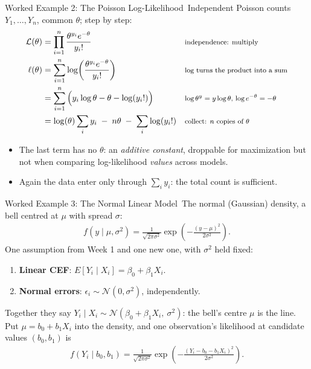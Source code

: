 \documentclass[aspectratio=169,11pt,xcolor=dvipsnames]{beamer}
\newcommand{\E}{E}
\newcommand{\lik}{\mathcal{L}}
\newcommand{\loglik}{\ell}
\newcommand{\core}{\,\raisebox{0.6pt}{\textcolor{corestar}{$\bigstar$}}}
\begin{document}
\begin{frame}{Worked Example 2: The Poisson Log-Likelihood\core}
Independent Poisson counts $Y_1,\dots,Y_n$, common $\theta$; step by step:
\begingroup
\setlength{\abovedisplayskip}{2pt}\setlength{\belowdisplayskip}{2pt}
\begin{align*}
  \lik(\theta) &= \prod_{i=1}^n \frac{\theta^{y_i}e^{-\theta}}{y_i!}
    && \text{\footnotesize independence: multiply} \\
  \loglik(\theta) &= \sum_{i=1}^n \log\!\left(\frac{\theta^{y_i}e^{-\theta}}{y_i!}\right)
    && \text{\footnotesize log turns the product into a sum} \\
  &= \sum_{i=1}^n \Big( y_i\log\theta - \theta - \log(y_i!)\Big)
    && \text{\footnotesize $\log\theta^{y} = y\log\theta$, $\log e^{-\theta} = -\theta$} \\
  &= \log(\theta)\sum_{i} y_i \;-\; n\theta \;-\; \sum_i \log(y_i!)
    && \text{\footnotesize collect: $n$ copies of $\theta$}
\end{align*}
\endgroup
\begin{itemize}\itemsep1pt
  \item The last term has no $\theta$: an \emph{additive constant},
        droppable for maximization but not when comparing log-likelihood
        \emph{values} across models.
  \item Again the data enter only through $\sum_i y_i$: the total count is
        sufficient.
\end{itemize}
\vskip-3pt
\end{frame}

\begin{frame}{Worked Example 3: The Normal Linear Model\core}
The normal (Gaussian) density, a bell centred at $\mu$ with spread $\sigma$:
\begin{align*}
  f(y \mid \mu, \sigma^2)
  = \frac{1}{\sqrt{2\pi\sigma^2}}\exp\!\left(-\frac{(y-\mu)^2}{2\sigma^2}\right) .
\end{align*}
One assumption from Week 1 and one new one, with $\sigma^2$ held fixed:
\begin{enumerate}\itemsep3pt
  \item \textbf{Linear CEF}: $\E[Y_i \mid X_i] = \beta_0 + \beta_1 X_i$.
  \item \textbf{Normal errors}: $\epsilon_i \sim \mathcal N(0,\sigma^2)$,
        independently.
\end{enumerate}
Together they say $Y_i \mid X_i \sim \mathcal N(\beta_0 + \beta_1 X_i,\
\sigma^2)$: the bell's centre $\mu$ is the line. Put $\mu = b_0 + b_1X_i$
into the density, and one observation's likelihood at candidate values
$(b_0,b_1)$ is
\begin{align*}
  f(Y_i \mid b_0, b_1)
  = \frac{1}{\sqrt{2\pi\sigma^2}}
    \exp\!\left(-\frac{(Y_i - b_0 - b_1 X_i)^2}{2\sigma^2}\right) .
\end{align*}
\end{frame}
\end{document}
